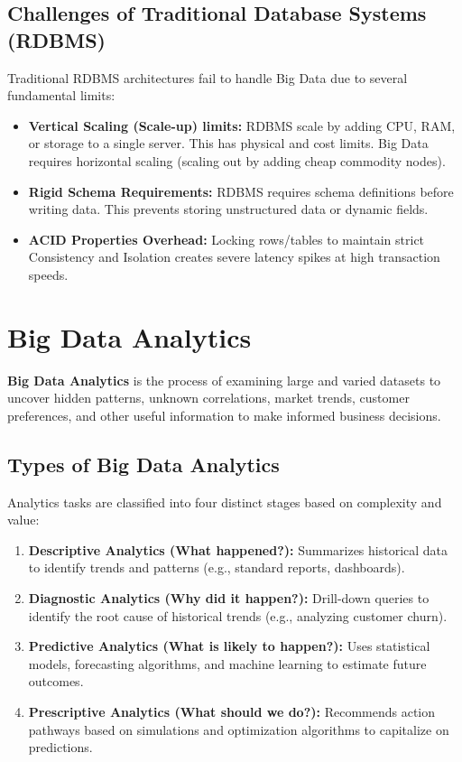 \documentclass[12pt,a4paper]{article}
\begin{document}
\subsection{Challenges of Traditional Database Systems (RDBMS)}
Traditional RDBMS architectures fail to handle Big Data due to several fundamental limits:
\begin{itemize}[leftmargin=*, itemsep=3pt]
  \item \textbf{Vertical Scaling (Scale-up) limits:} RDBMS scale by adding CPU, RAM, or storage to a single server. This has physical and cost limits. Big Data requires horizontal scaling (scaling out by adding cheap commodity nodes).
  \item \textbf{Rigid Schema Requirements:} RDBMS requires schema definitions before writing data. This prevents storing unstructured data or dynamic fields.
  \item \textbf{ACID Properties Overhead:} Locking rows/tables to maintain strict Consistency and Isolation creates severe latency spikes at high transaction speeds.
\end{itemize}

\section{Big Data Analytics}

\begin{tcolorbox}[defbox, title={Big Data Analytics}]
  \textbf{Big Data Analytics} is the process of examining large and varied datasets to uncover hidden patterns, unknown correlations, market trends, customer preferences, and other useful information to make informed business decisions.
\end{tcolorbox}

\subsection{Types of Big Data Analytics}
Analytics tasks are classified into four distinct stages based on complexity and value:

\begin{enumerate}[leftmargin=*, itemsep=3pt]
  \item \textbf{Descriptive Analytics (What happened?):} Summarizes historical data to identify trends and patterns (e.g., standard reports, dashboards).
  \item \textbf{Diagnostic Analytics (Why did it happen?):} Drill-down queries to identify the root cause of historical trends (e.g., analyzing customer churn).
  \item \textbf{Predictive Analytics (What is likely to happen?):} Uses statistical models, forecasting algorithms, and machine learning to estimate future outcomes.
  \item \textbf{Prescriptive Analytics (What should we do?):} Recommends action pathways based on simulations and optimization algorithms to capitalize on predictions.
\end{enumerate}
\end{document}
